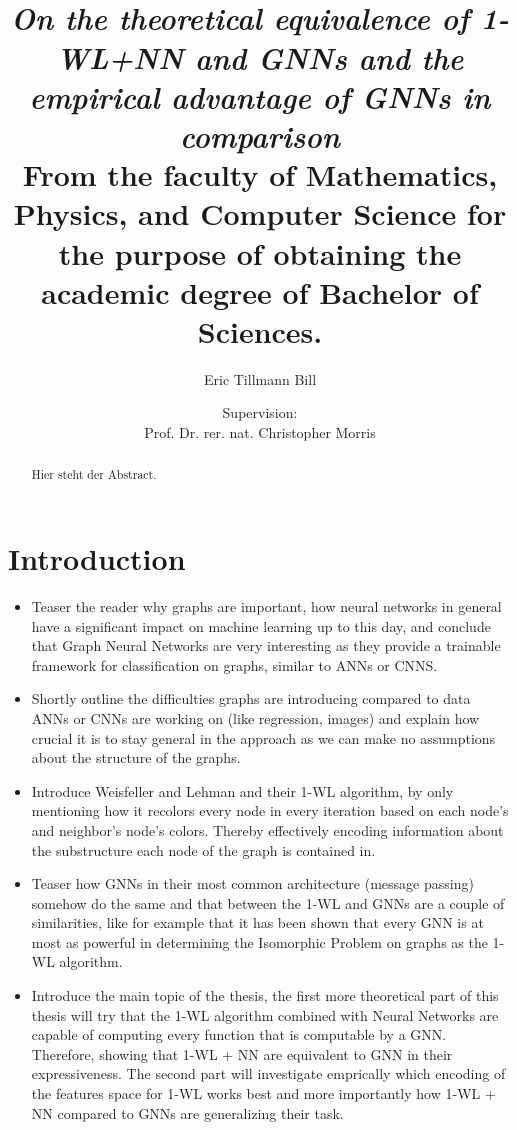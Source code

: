 \documentclass[11pt, dvipsnames, DIV=12]{scrreprt}
\title{\\\emph{On the theoretical equivalence of 1-WL+NN and GNNs and the empirical advantage of GNNs in comparison}\\
\vspace{20}
\small{\normalfont From the faculty of Mathematics, Physics, and Computer Science for the purpose of obtaining the academic degree of Bachelor of Sciences.}
}
\author{Eric Tillmann Bill}
\affil{\vspace{100}}
\author{Supervision:\\Prof. Dr. rer. nat. Christopher Morris}
\affil{Informatik 6\\RWTH Aachen University}
\date{\vspace{-30pt}}
\theoremstyle{definition}
\begin{document}
  
\maketitle

\tableofcontents

\begin{abstract}
Hier steht der Abstract.
\end{abstract}

\section{Introduction}
\begin{itemize}
    \item Teaser the reader why graphs are important, how neural networks in general have a significant impact on machine learning up to this day, and conclude that Graph Neural Networks are very interesting as they provide a trainable framework for classification on graphs, similar to ANNs or CNNS.
    \item Shortly outline the difficulties graphs are introducing compared to data ANNs or CNNs are working on (like regression, images) and explain how crucial it is to stay general in the approach as we can make no assumptions about the structure of the graphs.
    \item Introduce Weisfeller and Lehman and their 1-WL algorithm, by only mentioning how it recolors every node in every iteration based on each node's and neighbor's node's colors. Thereby effectively encoding information about the substructure each node of the graph is contained in.
    \item Teaser how GNNs in their most common architecture (message passing) somehow do the same and that between the 1-WL and GNNs are a couple of similarities, like for example that it has been shown that every GNN is at most as powerful in determining the Isomorphic Problem on graphs as the 1-WL algorithm.
    \item Introduce the main topic of the thesis, the first more theoretical part of this thesis will try that the 1-WL algorithm combined with Neural Networks are capable of computing every function that is computable by a GNN. Therefore, showing that 1-WL + NN are equivalent to GNN in their expressiveness. The second part will investigate emprically which encoding of the features space for 1-WL works best and more importantly how 1-WL + NN compared to GNNs are generalizing their task.
\end{itemize}
\end{document}
